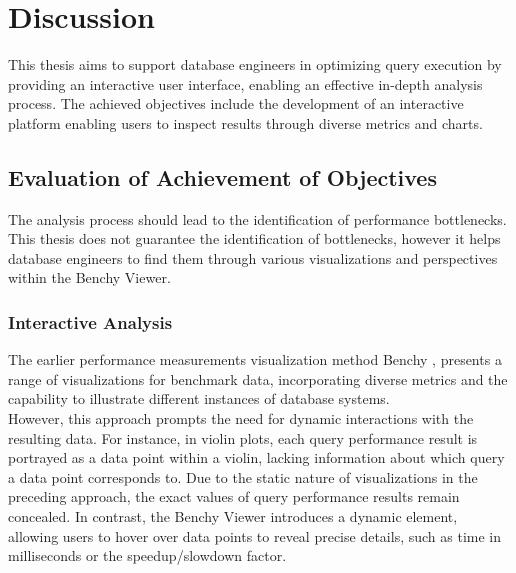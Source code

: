 
\chapter{Discussion}\label{chapter:discussion}

This thesis aims to support database engineers in optimizing query execution by providing an interactive user interface, enabling an effective in-depth analysis process. The achieved objectives include the development of an interactive platform enabling users to inspect results through diverse metrics and charts. 

\section{Evaluation of Achievement of Objectives}

The analysis process should lead to the identification of performance bottlenecks.
This thesis does not guarantee the identification of bottlenecks, however it helps database engineers to find them through various visualizations and perspectives within the Benchy Viewer.


\subsection{Interactive Analysis}
The earlier performance measurements visualization method Benchy \parencite*{benchy},  presents a range of visualizations for benchmark data, incorporating diverse metrics and the capability to illustrate different instances of database systems.\\
However, this approach prompts the need for dynamic interactions with the resulting data. For instance, in violin plots, each query performance result is portrayed as a data point within a violin, lacking information about which query a data point corresponds to. Due to the static nature of visualizations in the preceding approach, the exact values of query performance results remain concealed. In contrast, the Benchy Viewer introduces a dynamic element, allowing users to hover over data points to reveal precise details, such as time in milliseconds or the speedup/slowdown factor.



